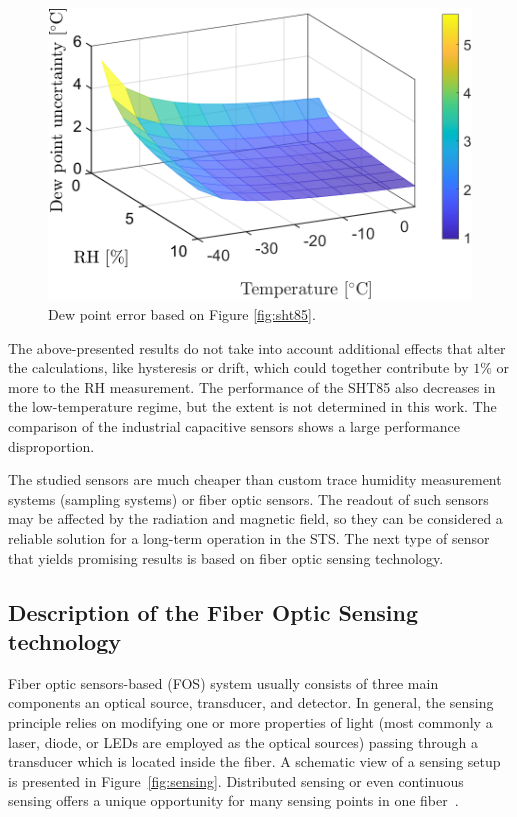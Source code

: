 \begin{figure}[!h]
\centering
\includegraphics[width=0.6\columnwidth]{Chapter5/images/SHTRH15T02.png}
\caption{Dew point error based on Figure \ref{fig:sht85}.}
\label{fig:sht85_dp}
\end{figure}
\newpage
The above-presented results do not take into account additional effects that alter the calculations, like hysteresis or drift, which could together contribute by $1$\% or more to the \gls{RH} measurement. The performance of the SHT85 also decreases in the low-temperature regime, but the extent is not determined in this work. The comparison of the industrial capacitive sensors shows a large performance disproportion.

The studied sensors are much cheaper than custom trace humidity measurement systems (sampling systems) or fiber optic sensors. The readout of such sensors may be affected by the radiation and magnetic field, so they can be considered a reliable solution for a long-term operation in the \gls{STS}. The next type of sensor that yields promising results is based on fiber optic sensing technology.

\subsection{Description of the Fiber Optic Sensing technology}
\label{FOS}

Fiber optic sensors-based (\gls{FOS}) system usually consists of three main components an optical source, transducer, and detector. In general, the sensing principle relies on modifying one or more properties of light (most commonly a laser, diode, or LEDs are employed as the optical sources) passing through a transducer which is located inside the fiber. A schematic view of a sensing setup is presented in Figure~\ref{fig:sensing}. Distributed sensing or even continuous sensing offers a unique opportunity for many sensing points in one fiber~\cite{GRATTAN200040}. 

